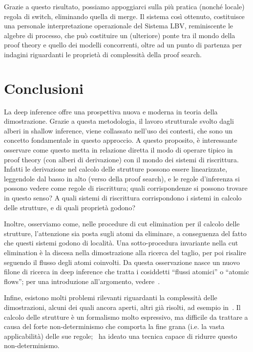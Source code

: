 \documentclass[12pt,a4paper,openright,twoside]{report}
\begin{document}
Grazie a questo risultato, possiamo appoggiarci sulla pi\`u pratica (nonch\'e locale) regola di switch, eliminando quella di merge. Il sistema cos\`i ottenuto, costituisce una personale interpretazione operazionale del Sistema \textsf{LBV}, reminiscente le algebre di processo, che pu\`o costituire un (ulteriore) ponte tra il mondo della proof theory e quello dei modelli concorrenti, oltre ad un punto di partenza per indagini riguardanti le propriet\`a di complessit\`a della proof search.

\clearpage{\pagestyle{empty}\cleardoublepage}
\chapter*{Conclusioni}

La deep inference offre una prospettiva nuova e moderna in teoria della dimostrazione. Grazie a questa metodologia, il lavoro strutturale svolto dagli alberi in shallow inference, viene collassato nell'uso dei contesti, che sono un concetto fondamentale in questo approccio. A questo proposito, \`e interessante osservare come questo metta in relazione diretta il modo di operare tipico in proof theory (con alberi di derivazione) con il mondo dei sistemi di riscrittura. Infatti le derivazione nel calcolo delle strutture possono essere linearizzate, leggendole dal basso in alto (verso della proof search), e le regole d'inferenza si possono vedere come regole di riscrittura; quali corrispondenze si possono trovare in questo senso? A quali sistemi di riscrittura corrispondono i sistemi in calcolo delle strutture, e di quali propriet\`a godono?

Inoltre, osserviamo come, nelle procedure di cut elimination per il calcolo delle strutture, l'attenzione sia posta sugli atomi da eliminare, a conseguenza del fatto che questi sistemi godono di localit\`a. Una sotto-procedura invariante nella cut elimination \`e la discesa nella dimostrazione alla ricerca del taglio, per poi risalire seguendo il flusso degli atomi coinvolti. Da questa osservazione nasce un nuovo filone di ricerca in deep inference che tratta i cosiddetti ``flussi atomici'' o ``atomic flows''; per una introduzione all'argomento, vedere~\cite{Gund09}.

Infine, esistono molti problemi rilevanti riguardanti la complessit\`a delle dimostrazioni, alcuni dei quali ancora aperti, altri gi\`a risolti, ad esempio in~\cite{Jer09, BruGug09, BruGugGunPar09}. Il calcolo delle strutture \`e un formalismo molto espressivo, ma difficile da trattare a causa del forte non-determinismo che comporta la fine grana (i.e. la vasta applicabilit\`a) delle sue regole; \cite{Kah06}~ha ideato una tecnica capace di ridurre questo non-determinismo.
\end{document}
